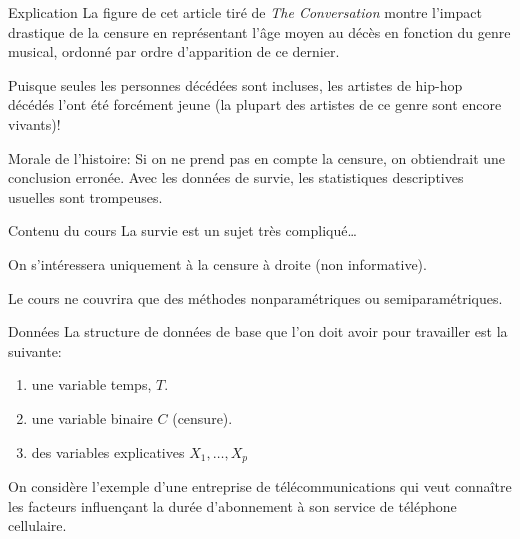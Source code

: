 \documentclass[
  ignorenonframetext,
]{beamer}
\providecommand{\tightlist}{%
  \setlength{\itemsep}{0pt}\setlength{\parskip}{0pt}}
\begin{document}
\begin{frame}{Explication}
\protect{}\label{explication}
La figure de cet article tiré de \emph{The Conversation} montre l'impact
drastique de la censure en représentant l'âge moyen au décès en fonction
du genre musical, ordonné par ordre d'apparition de ce dernier.

Puisque seules les personnes décédées sont incluses, les artistes de
hip-hop décédés l'ont été forcément jeune (la plupart des artistes de ce
genre sont encore vivants)!

Morale de l'histoire: Si on ne prend pas en compte la censure, on
obtiendrait une conclusion erronée. Avec les données de survie, les
statistiques descriptives usuelles sont trompeuses.
\end{frame}

\begin{frame}{Contenu du cours}
\protect{}\label{contenu-du-cours}
La survie est un sujet très compliqué\ldots{}

On s'intéressera uniquement à la censure à droite (non informative).

Le cours ne couvrira que des méthodes nonparamétriques ou
semiparamétriques.
\end{frame}

\begin{frame}{Données}
\protect{}\label{donnuxe9es}
La structure de données de base que l'on doit avoir pour travailler est
la suivante:

\begin{enumerate}
\tightlist
\item
  une variable temps, \(T\).
\item
  une variable binaire \(C\) (censure).
\item
  des variables explicatives \(X_1, \ldots, X_p\)
\end{enumerate}

On considère l'exemple d'une entreprise de télécommunications qui veut
connaître les facteurs influençant la durée d'abonnement à son service
de téléphone cellulaire.
\end{frame}
\end{document}
